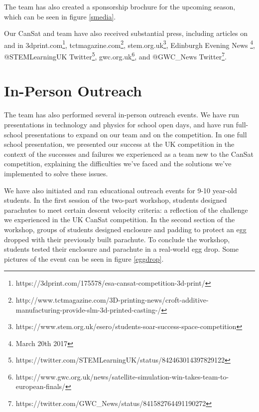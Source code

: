 \documentclass[]{report}
\begin{document}
	The team has also created a sponsorship brochure for the upcoming season, which can be seen in figure \ref{smedia}.
	
	Our CanSat and team have also received substantial press, including articles on and in 3dprint.com\footnote{https://3dprint.com/175578/esa-cansat-competition-3d-print/}, tctmagazine.com\footnote{http://www.tctmagazine.com/3D-printing-news/croft-additive-manufacturing-provide-slm-3d-printed-casting-/}, stem.org.uk\footnote{https://www.stem.org.uk/esero/students-soar-success-space-competition}, Edinburgh Evening News \footnote{March 20th 2017}, @STEMLearningUK Twitter\footnote{https://twitter.com/STEMLearningUK/status/842463014397829122}, gwc.org.uk\footnote{https://www.gwc.org.uk/news/satellite-simulation-win-takes-team-to-european-finals/}, and @GWC\_News Twitter\footnote{https://twitter.com/GWC\_News/status/841582764491190272}.
	\section{In-Person Outreach}
	The team has also performed several in-person outreach events. We have run presentations in technology and physics for school open days, and have run full-school presentations to expand on our team and on the competition. In one full school presentation, we presented our success at the UK competition in the context of the successes and failures we experienced as a team new to the CanSat competition, explaining the difficulties we've faced and the solutions we've implemented to solve these issues.
	
	We have also initiated and ran educational outreach events for 9-10 year-old students. In the first session of the two-part workshop, students designed parachutes to meet certain descent velocity criteria: a reflection of the challenge we experienced in the UK CanSat competition. In the second section of the workshop, groups of students designed enclosure and padding to protect an egg dropped with their previously built parachute. To conclude the workshop, students tested their enclosure and parachute in a real-world egg drop. Some pictures of the event can be seen in figure \ref{eggdrop}.
	
\end{document}
